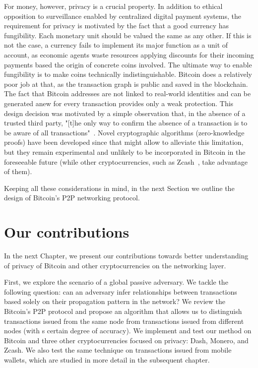 For money, however, privacy is a crucial property.
In addition to ethical opposition to surveillance enabled by centralized digital payment systems, the requirement for privacy is motivated by the fact that a good currency has fungibility.
Each monetary unit should be valued the same as any other.
If this is not the case, a currency fails to implement its major function as a unit of account, as economic agents waste resources applying discounts for their incoming payments based the origin of concrete coins involved.
The ultimate way to enable fungibility is to make coins technically indistinguishable.
Bitcoin does a relatively poor job at that, as the transaction graph is public and saved in the blockchain.
The fact that Bitcoin addresses are not linked to real-world identities and can be generated anew for every transaction provides only a weak protection.
This design decision was motivated by a simple observation that, in the absence of a trusted third party, "[t]he only way to confirm the absence of a transaction is to be aware of all transactions"~\cite{Nakamoto2008}.
Novel cryptographic algorithms (zero-knowledge proofs) have been developed since that might allow to alleviate this limitation, but they remain experimental and unlikely to be incorporated in Bitcoin in the foreseeable future (while other cryptocurrencies, such as Zcash~\cite{BenSasson2014}, take advantage of them).

Keeping all these considerations in mind, in the next Section we outline the design of Bitcoin's P2P networking protocol.



\section{Our contributions}
\label{sec:C02S4OurContributions}

In the next Chapter, we present our contributions towards better understanding of privacy of Bitcoin and other cryptocurrencies on the networking layer.

First, we explore the scenario of a global passive adversary.
We tackle the following question: can an adversary infer relationships between transactions based solely on their propagation pattern in the network?
We review the Bitcoin's P2P protocol and propose an algorithm that allows us to distinguish transactions issued from the same node from transactions issued from different nodes (with s certain degree of accuracy).
We implement and test our method on Bitcoin and three other cryptocurrencies focused on privacy: Dash, Monero, and Zcash.
We also test the same technique on transactions issued from mobile wallets, which are studied in more detail in the subsequent chapter.

